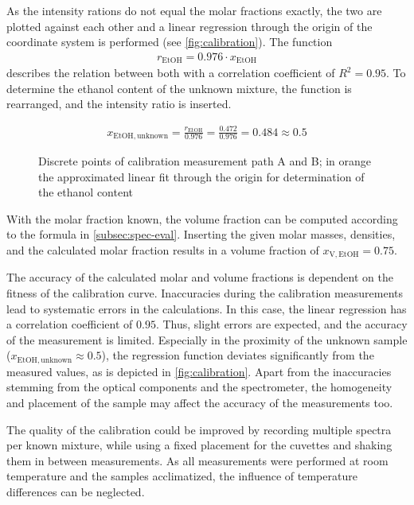 As the intensity rations do not equal the molar fractions exactly, the two are plotted against each other and a linear regression through the origin of the coordinate system is performed (see \autoref{fig:calibration}). The function
\begin{align}
    r_\mathrm{EtOH}=0.976 \cdot x_\mathrm{EtOH} \nonumber
\end{align}
describes the relation between both with a correlation coefficient of $R^2=0.95$. To determine the ethanol content of the unknown mixture, the function is rearranged, and the intensity ratio is inserted.

\begin{align}
    x_\mathrm{EtOH,unknown}=\frac{r_\mathrm{EtOH}}{0.976}=\frac{0.472}{0.976}=0.484\approx0.5 \nonumber
\end{align}

\begin{figure}[!htb]
    \centering
    
    \caption[Plot of calibration measurement with linear fit]{Discrete points of calibration measurement path A and B; in orange the approximated linear fit through the origin for determination of the ethanol content}
    \label{fig:calibration}
\end{figure}

With the molar fraction known, the volume fraction can be computed according to the formula in \autoref{subsec:spec-eval}. Inserting the given molar masses, densities, and the calculated molar fraction results in a volume fraction of $x_\mathrm{V,EtOH}=0.75$.

The accuracy of the calculated molar and volume fractions is dependent on the fitness of the calibration curve. Inaccuracies during the calibration measurements lead to systematic errors in the calculations. In this case, the linear regression has a correlation coefficient of $0.95$. Thus, slight errors are expected, and the accuracy of the measurement is limited. Especially in the proximity of the unknown sample ($x_\mathrm{EtOH,unknown} \approx 0.5$), the regression function deviates significantly from the measured values, as is depicted in \autoref{fig:calibration}. Apart from the inaccuracies stemming from the optical components and the spectrometer, the homogeneity and placement of the sample may affect the accuracy of the measurements too.

The quality of the calibration could be improved by recording multiple spectra per known mixture, while using a fixed placement for the cuvettes and shaking them in between measurements. As all measurements were performed at room temperature and the samples acclimatized, the influence of temperature differences can be neglected.

